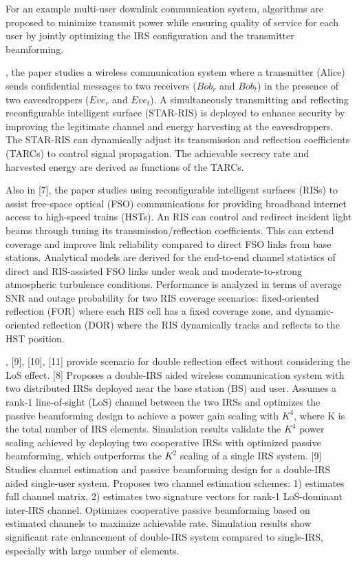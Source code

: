 \documentclass[11pt,twocolumn,twoside]{opticajnl}
\begin{document}
For an example multi-user downlink communication system, algorithms are proposed to minimize transmit power while ensuring quality of service for each user by jointly optimizing the IRS configuration and the transmitter beamforming.
\par [6], the paper studies a wireless communication system where a transmitter (Alice) sends confidential messages to two receivers ($Bob_r$ and $Bob_t$) in the presence of two eavesdroppers ($Eve_r$ and $Eve_t$). A simultaneously transmitting and reflecting reconfigurable intelligent surface (STAR-RIS) is deployed to enhance security by improving the legitimate channel and energy harvesting at the eavesdroppers. The STAR-RIS can dynamically adjust its transmission and reflection coefficients (TARCs) to control signal propagation. The achievable secrecy rate and harvested energy are derived as functions of the TARCs.
\par Also in [7], the paper studies using reconfigurable intelligent surfaces (RISs) to assist free-space optical (FSO) communications for providing broadband internet access to high-speed trains (HSTs).
An RIS can control and redirect incident light beams through tuning its transmission/reflection coefficients. This can extend coverage and improve link reliability compared to direct FSO links from base stations. Analytical models are derived for the end-to-end channel statistics of direct and RIS-assisted FSO links under weak and moderate-to-strong atmospheric turbulence conditions. Performance is analyzed in terms of average SNR and outage probability for two RIS coverage scenarios: fixed-oriented reflection (FOR) where each RIS cell has a fixed coverage zone, and dynamic-oriented reflection (DOR) where the RIS dynamically tracks and reflects to the HST position.
\par [8], [9], [10], [11]  provide scenario for double reflection effect without considering the LoS effect.
[8] Proposes a double-IRS aided wireless communication system with two distributed IRSs deployed near the base station (BS) and user.
Assumes a rank-1 line-of-sight (LoS) channel between the two IRSs and optimizes the passive beamforming design to achieve a power gain scaling with $K^4$, where K is the total number of IRS elements.
Simulation results validate the $K^4$ power scaling achieved by deploying two cooperative IRSs with optimized passive beamforming, which outperforms the $K^2$ scaling of a single IRS system. [9] Studies channel estimation and passive beamforming design for a double-IRS aided single-user system. Proposes two channel estimation schemes: 1) estimates full channel matrix, 2) estimates two signature vectors for rank-1 LoS-dominant inter-IRS channel. Optimizes cooperative passive beamforming based on estimated channels to maximize achievable rate. Simulation results show significant rate enhancement of double-IRS system compared to single-IRS, especially with large number of elements.
\end{document}
